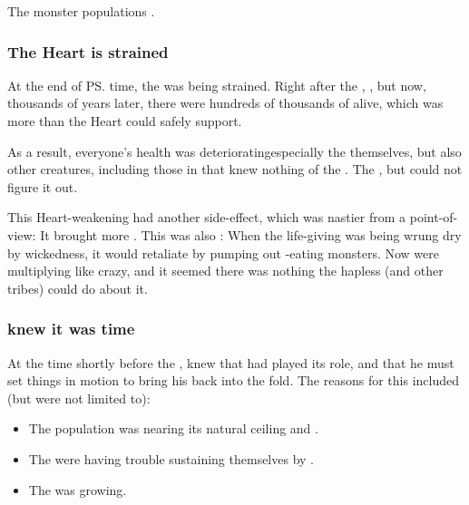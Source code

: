 The monster populations . 





\subsubsection{The Heart is strained}
At the end of \ps{\Merkyrah} time, the  was being strained. 
Right after the \firstbanewar, , but now, thousands of years later, there were hundreds of thousands of \resphain{} alive, which was more than the Heart could safely support. 

As a result, everyone's health was deteriorating\dash especially the \resphain{} themselves, but also other creatures, including those in \Tembrae{} that knew nothing of the \resphain. 
The \dragons{} , but could not figure it out. 

This Heart-weakening had another side-effect, which was nastier from a \resphan{} point-of-view:
It brought more \umbrae. 
This was also : 
When the life-giving \dweomer{} was being wrung dry by \bane{} wickedness, it would retaliate by pumping out \bane-eating monsters. 
Now \umbrae{} were multiplying like crazy, and it seemed there was nothing the hapless \Merkyrans{} (and other \resphan{} tribes) could do about it. 





\subsubsection{\Daggerrain knew it was time}
At the time shortly before the , \Daggerrain{} knew that \Merkyrah{} had played its role, and that he must set things in motion to bring his \resphain{} back into the fold. 
The reasons for this included (but were not limited to):

\begin{itemize}
  \item 
    The \resphan{} population was nearing its natural ceiling and . 
  \item 
    The \resphain{} were having trouble sustaining themselves by . 
  \item 
    The  was growing. 
\end{itemize}










